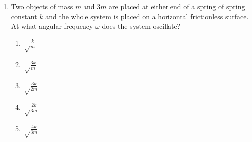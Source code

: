 \documentclass[12pt,letterpaper]{article}
\begin{document}
\begin{enumerate}[resume]


\vfill
\newpage

\item
Two objects of mass $m$ and $3m$ are placed at either end of a spring of spring constant $k$ and the whole system is placed on a horizontal frictionless surface. At what angular frequency $\omega$ does the system oscillate?
\begin{enumerate}
\item $\displaystyle \sqrt\frac{k}{m}$
\item $\displaystyle \sqrt\frac{3k}{m}$
\item $\displaystyle \sqrt\frac{3k}{2m}$
\item $\displaystyle \sqrt\frac{2k}{3m}$
\item $\displaystyle \sqrt\frac{4k}{3m}$
\end{enumerate}


\end{enumerate}
\end{document}

